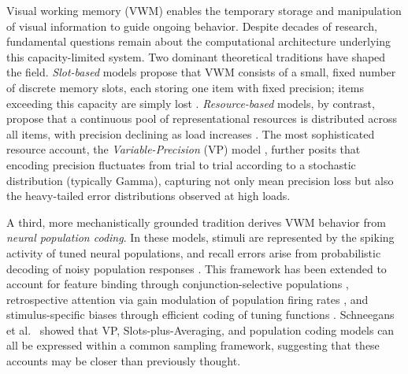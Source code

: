 \documentclass[11pt,letterpaper]{article}
\begin{document}
Visual working memory (VWM) enables the temporary storage and manipulation of visual information to guide ongoing behavior. Despite decades of research, fundamental questions remain about the computational architecture underlying this capacity-limited system. Two dominant theoretical traditions have shaped the field. \emph{Slot-based} models propose that VWM consists of a small, fixed number of discrete memory slots, each storing one item with fixed precision; items exceeding this capacity are simply lost \cite{luckCapacityVisualWorking1997c, zhangDiscreteFixedresolutionRepresentations2008b}. \emph{Resource-based} models, by contrast, propose that a continuous pool of representational resources is distributed across all items, with precision declining as load increases \cite{baysPrecisionVisualWorking2009b, maChangingConceptsWorking2014a, vandenbergVariabilityEncodingPrecision2012}. The most sophisticated resource account, the \emph{Variable-Precision} (VP) model \cite{vandenbergVariabilityEncodingPrecision2012}, further posits that encoding precision fluctuates from trial to trial according to a stochastic distribution (typically Gamma), capturing not only mean precision loss but also the heavy-tailed error distributions observed at high loads.

A third, more mechanistically grounded tradition derives VWM behavior from \emph{neural population coding}. In these models, stimuli are represented by the spiking activity of tuned neural populations, and recall errors arise from probabilistic decoding of noisy population responses \cite{baysNoiseNeuralPopulations2014a}. This framework has been extended to account for feature binding through conjunction-selective populations \cite{schneegansNeuralArchitectureFeature2017c}, retrospective attention via gain modulation of population firing rates \cite{baysNeuralModelRetrospective2018a}, and stimulus-specific biases through efficient coding of tuning functions \cite{taylorEfficientCodingVisual2018}. Schneegans et al.\ \cite{schneegansStochasticSamplingProvides2020} showed that VP, Slots-plus-Averaging, and population coding models can all be expressed within a common sampling framework, suggesting that these accounts may be closer than previously thought.
\end{document}
